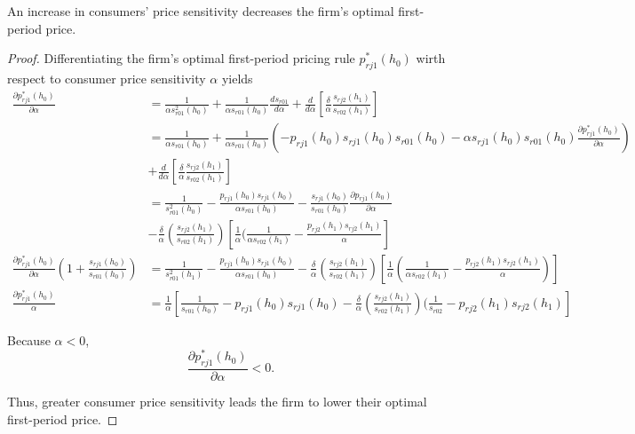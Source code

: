 \begin{proposition}
\label{prop:three}
  An increase in consumers' price sensitivity decreases the firm's optimal
  first-period price.
\end{proposition}

\begin{proof}
  Differentiating the firm's optimal first-period pricing rule $p_{rj1}^*(h_0)$
  wirth respect to consumer price sensitivity $\alpha$ yields
  \begin{align*}
    \frac{\partial p_{rj1}^*(h_0)}{\partial\alpha} &= \frac{1}{\alpha s_{r01}^2(h_0)} + \frac{1}{\alpha s_{r01}(h_0)}\frac{ds_{r01}}{d\alpha} + \frac{d}{d\alpha}[\frac{\delta}{\alpha}\frac{s_{rj2}(h_1)}{s_{r02}(h_1)}] \\
    &= \frac{1}{\alpha s_{r01}(h_0)} + \frac{1}{\alpha
    s_{r01}(h_0)}(-p_{rj1}(h_0)s_{rj1}(h_0)s_{r01}(h_0) - \alpha
    s_{rj1}(h_0)s_{r01}(h_0)\frac{\partial p_{rj1}^*(h_0)}{\partial \alpha})\\ &+
    \frac{d}{d\alpha}[\frac{\delta}{\alpha}\frac{s_{rj2}(h_1)}{s_{r02}(h_1)}] \\
    &= \frac{1}{s_{r01}^2(h_0)} - \frac{p_{rj1}(h_0)s_{rj1}(h_0)}{\alpha s_{r01}(h_0)} - \frac{s_{rj1}(h_0)}{s_{r01}(h_0)}\frac{\partial p_{rj1}(h_0)}{\partial\alpha} \\
    &-
    \frac{\delta}{\alpha}(\frac{s_{rj2}(h_1)}{s_{r02}(h_1)})[\frac{1}{\alpha}(\frac{1}{\alpha
    s_{r02}(h_1)}-\frac{p_{rj2}(h_1)s_{rj2}(h_1)}{\alpha}] \\
    \frac{\partial p_{rj1}^*(h_0)}{\partial\alpha}(1+\frac{s_{rj1}(h_0)}{s_{r01}(h_0)}) &= \frac{1}{s_{r01}^2(h_1)} - \frac{p_{rj1}(h_0)s_{rj1}(h_0)}{\alpha s_{r01}(h_0)} -
    \frac{\delta}{\alpha}(\frac{s_{rj2}(h_1)}{s_{r02}(h_1)})[\frac{1}{\alpha}(\frac{1}{\alpha
    s_{r02}(h_1)}-\frac{p_{rj2}(h_1)s_{rj2}(h_1)}{\alpha})] \\
    \frac{\partial p_{rj1}^*(h_0)}{\alpha} &=
    \frac{1}{\alpha}[\frac{1}{s_{r01}(h_0)} - p_{rj1}(h_0)s_{rj1}(h_0) -
    \frac{\delta}{\alpha}(\frac{s_{rj2}(h_1)}{s_{r02}(h_1)})(\frac{1}{s_{r02}} -
    p_{rj2}(h_1)s_{rj2}(h_1)]
  \end{align*}

  Because $\alpha < 0$, 
  \begin{equation}
    \frac{\partial p_{rj1}^*(h_0)}{\partial\alpha} < 0.
  \end{equation}

  Thus, greater consumer price sensitivity leads the firm to lower their optimal
  first-period price.
\end{proof}

